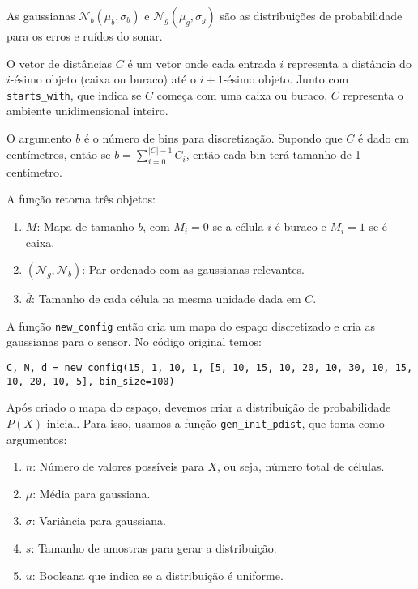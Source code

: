 \documentclass[12pt]{article}
\newcommand{\ov}{\overline}
\theoremstyle{plain}
\numberwithin{equation}{section}
\newcommand{\code}[1]{\lstinline[mathescape=true]{#1}}
\begin{document}
As gaussianas $\mathcal{N}_b(\mu_b, \sigma_b)$ e $\mathcal{N}_g(\mu_g, \sigma_g)$ são as
distribuições de probabilidade para os erros e ruídos do sonar.

O vetor de distâncias $C$ é um vetor onde cada entrada $i$ representa a distância do $i$-ésimo
objeto (caixa ou buraco) até o $i+1$-ésimo objeto. Junto com \code{starts_with}, que indica se $C$
começa com uma caixa ou buraco, $C$ representa o ambiente unidimensional inteiro.

O argumento $b$ é o número de bins para discretização. Supondo que $C$ é dado em centímetros, então
se $b=\sum_{i=0}^{|C|-1} C_i$, então cada bin terá tamanho de 1 centímetro.

A função retorna três objetos:

\begin{enumerate}
  \item $M$: Mapa de tamanho $b$, com $M_i=0$ se a célula $i$ é buraco e $M_i=1$ se é caixa.
  \item $(\mathcal{N}_g,\mathcal{N}_b)$: Par ordenado com as gaussianas relevantes.
  \item $\ov{d}$: Tamanho de cada célula na mesma unidade dada em $C$.
\end{enumerate}

A função \code{new_config} então cria um mapa do espaço discretizado e cria as gaussianas para o
sensor. No código original temos:\\

\begin{lstlisting}
C, N, d = new_config(15, 1, 10, 1, [5, 10, 15, 10, 20, 10, 30, 10, 15, 10, 20, 10, 5], bin_size=100)
\end{lstlisting}

Após criado o mapa do espaço, devemos criar a distribuição de probabilidade $P(X)$ inicial. Para
isso, usamos a função \code{gen_init_pdist}, que toma como argumentos:

\begin{enumerate}
  \item $n$: Número de valores possíveis para $X$, ou seja, número total de células.
  \item $\mu$: Média para gaussiana.
  \item $\sigma$: Variância para gaussiana.
  \item $s$: Tamanho de amostras para gerar a distribuição.
  \item $u$: Booleana que indica se a distribuição é uniforme.
\end{enumerate}
\end{document}
